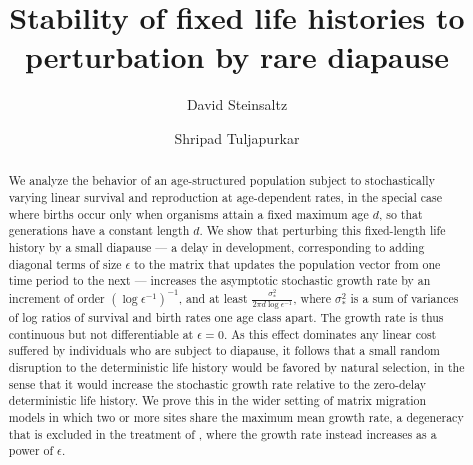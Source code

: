 \documentclass[11pt]{amsart}
\begin{document}
\title[Stochastic growth rates with rare diapause]{Stability of fixed life histories to perturbation by rare diapause}
\author{David Steinsaltz} 
\address{David Steinsaltz\\Department of Statistics\\University of Oxford\\24--29 St Giles\\Oxford OX1 2HB\\United Kingdom}
\author{Shripad Tuljapurkar}
 \address{Shripad Tuljapurkar\\454 Herrin Labs\\Department of Biology\\Stanford University\\Stanford CA 94305-5020\\USA}
 


\begin{abstract}
	We analyze the behavior of an age-structured population subject to stochastically
	varying linear survival and reproduction at age-dependent rates, in the special case
	where births occur only when organisms attain a fixed maximum age $d$, so that
	generations have a constant length $d$.
	We show that perturbing this fixed-length life history by a small diapause --- a
	delay in development, corresponding to adding diagonal terms of size $\epsilon$ to
	the matrix that updates the population vector from one time period to the next ---
	increases the asymptotic stochastic growth rate by an increment of order
	$(\log\epsilon^{-1})^{-1}$, and at least $\frac{\sigma_*^2}{2\pi d\log\epsilon^{-1}}$, where
	$\sigma_*^2$ is a sum of variances of log ratios of survival and birth rates one age
	class apart.
	The growth rate is thus continuous but not differentiable at $\epsilon=0$.
	As this effect dominates any linear cost suffered by individuals who are subject to
	diapause, it follows that a small random disruption to the deterministic life history
	would be favored by natural selection, in the sense that it would increase the
	stochastic growth rate relative to the zero-delay deterministic life history.
	We prove this in the wider setting of matrix migration models in which two or more
	sites share the maximum mean growth rate, a degeneracy that is excluded in the treatment of
	\cite{migration2018,jaggi2023migration}, where the growth rate instead increases as a
	power of $\epsilon$.
\end{abstract}
\maketitle
\end{document}
